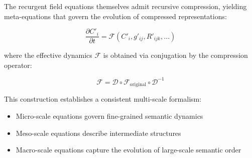 The recurgent field equations themselves admit recursive compression, yielding meta-equations that govern the evolution of compressed representations:

\begin{equation}
\frac{\partial C'_i}{\partial t} = \mathcal{F}(C'_i, g'_{ij}, R'_{ijk}, \ldots)
\end{equation}

where the effective dynamics \(\mathcal{F}\) is obtained via conjugation by the compression operator:

\begin{equation}
\mathcal{F} = \mathcal{D} \circ \mathcal{F}_{\mathrm{original}} \circ \mathcal{D}^{-1}
\end{equation}

This construction establishes a consistent multi-scale formalism:
\begin{itemize}
    \item Micro-scale equations govern fine-grained semantic dynamics
    \item Meso-scale equations describe intermediate structures
    \item Macro-scale equations capture the evolution of large-scale semantic order
\end{itemize}
